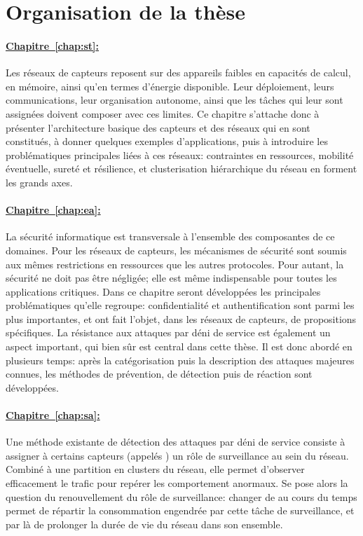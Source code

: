 \section{Organisation de la thèse}

\newcommand\chappar[1]{%
    \paragraph{\hyperref[chap:#1]{%
        Chapitre~\ref*{chap:#1}: \nameref*{chap:#1}%
}}}

\chappar{st}
Les réseaux de capteurs reposent sur des appareils faibles en capacités de calcul, en mémoire, ainsi qu'en termes d'énergie disponible.
Leur déploiement, leurs communications, leur organisation autonome, ainsi que les tâches qui leur sont assignées doivent composer avec ces limites.
Ce chapitre s'attache donc à présenter l'architecture basique des capteurs et des réseaux qui en sont constitués, à donner quelques exemples d'applications, puis à introduire les problématiques principales liées à ces réseaux: contraintes en ressources, mobilité éventuelle, sureté et résilience, et clusterisation hiérarchique du réseau en forment les grands axes.

\chappar{ea}
La sécurité informatique est transversale à l'ensemble des composantes de ce domaines.
Pour les réseaux de capteurs, les mécanismes de sécurité sont soumis aux mêmes restrictions en ressources que les autres protocoles.
Pour autant, la sécurité ne doit pas être négligée; elle est même indispensable pour toutes les applications critiques.
Dans ce chapitre seront développées les principales problématiques qu'elle regroupe: confidentialité et authentification sont parmi les plus importantes, et ont fait l'objet, dans les réseaux de capteurs, de propositions spécifiques.
La résistance aux attaques par déni de service est également un aspect important, qui bien sûr est central dans cette thèse.
Il est donc abordé en plusieurs temps: après la catégorisation puis la description des attaques majeures connues, les méthodes de prévention, de détection puis de réaction sont développées.

\chappar{sa}
Une méthode existante de détection des attaques par déni de service consiste à assigner à certains capteurs (appelés \cnst) un rôle de surveillance au sein du réseau.
Combiné à une partition en clusters du réseau, elle permet d'observer efficacement le trafic pour repérer les comportement anormaux.
Se pose alors la question du renouvellement du rôle de surveillance: changer de \cnst au cours du temps permet de répartir la consommation engendrée par cette tâche de surveillance, et par là de prolonger la durée de vie du réseau dans son ensemble.

